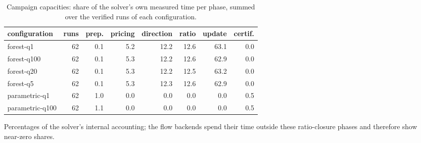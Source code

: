 \begin{table}[tbp]
\centering
\caption{Campaign capacities: share of the solver's own measured time per phase, summed over the verified runs of each configuration.}
\label{tab:capacities-breakdown}
\small
\begin{adjustbox}{max width=\textwidth}
\begin{tabular}{lrrrrrrr}
\toprule
configuration & runs & prep. & pricing & direction & ratio & update & certif. \\
\midrule
forest-q1 & 62 & 0.1 & 5.2 & 12.2 & 12.6 & 63.1 & 0.0 \\
forest-q100 & 62 & 0.1 & 5.3 & 12.2 & 12.6 & 62.9 & 0.0 \\
forest-q20 & 62 & 0.1 & 5.3 & 12.2 & 12.5 & 63.2 & 0.0 \\
forest-q5 & 62 & 0.1 & 5.3 & 12.3 & 12.6 & 62.9 & 0.0 \\
parametric-q1 & 62 & 1.0 & 0.0 & 0.0 & 0.0 & 0.0 & 0.5 \\
parametric-q100 & 62 & 1.1 & 0.0 & 0.0 & 0.0 & 0.0 & 0.5 \\
\bottomrule
\end{tabular}
\end{adjustbox}
\par\vspace{2pt}\footnotesize Percentages of the solver's internal accounting; the flow backends spend their time outside these ratio-closure phases and therefore show near-zero shares.
\end{table}
